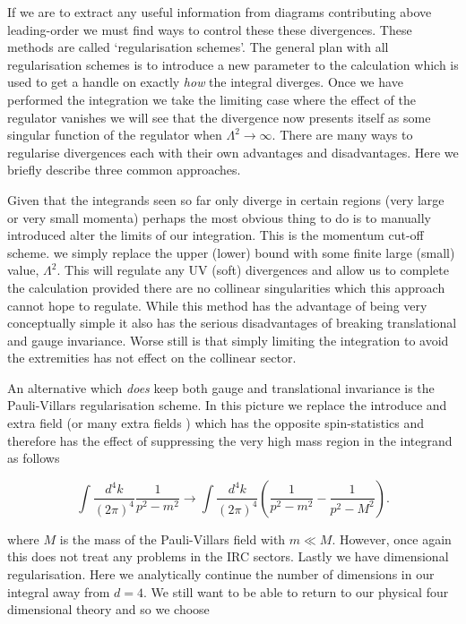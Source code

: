 		If we are to extract any useful information from diagrams contributing above leading-order we must find
		ways to control these these divergences.  These methods are called `regularisation schemes'.  The
		general plan with all regularisation schemes is to introduce a new parameter to the calculation which
		is used to get a handle on exactly \emph{how} the integral diverges.  Once we have performed the integration
		we take the limiting case where the effect of the regulator vanishes we will see that the divergence now
		presents itself as some singular function of the regulator when $\Lambda^2\rightarrow\infty$.  There are
		many ways to regularise divergences each with their own advantages and disadvantages.  Here we briefly describe
		three common approaches.

		Given that the integrands seen so far only diverge in certain regions (very large or very small momenta)
		perhaps the most obvious thing to do is to manually introduced alter the limits of our integration. This
		is the momentum cut-off scheme. we simply replace the upper (lower) bound with some finite large (small)
		value, $\Lambda^2$.  This will regulate any UV (soft) divergences and allow us to complete the calculation
		provided there are no collinear singularities which this approach cannot hope to regulate.  While this
		method has the advantage of being very conceptually simple it also has the serious disadvantages of
		breaking translational and gauge invariance.  Worse still is that simply limiting the integration to
		avoid the extremities has not effect on the collinear sector.

		An alternative which \emph{does} keep both gauge and translational invariance is the Pauli-Villars
		regularisation scheme.  In this picture we replace the introduce and extra field (or many extra fields
		\cite{FROLOV1993344}) which has the opposite spin-statistics and therefore has the effect of suppressing
		the very high mass region in the integrand as follows

		\begin{equation}
			\int\frac{d^4k}{(2\pi)^4}\frac{1}{p^2-m^2}\rightarrow\int\frac{d^4k}{(2\pi)^4}\left(\frac{1}{p^2-m^2} - \frac{1}{p^2-M^2}\right).
		\end{equation}

		where $M$ is the mass of the Pauli-Villars field with $m\ll M$.  However, once again this does not treat any
		problems in the IRC sectors.  Lastly we have dimensional regularisation.  Here we analytically continue the
		number of dimensions in our integral away from $d=4$.  We still want to be able to return to our physical four
		dimensional theory and so we choose

